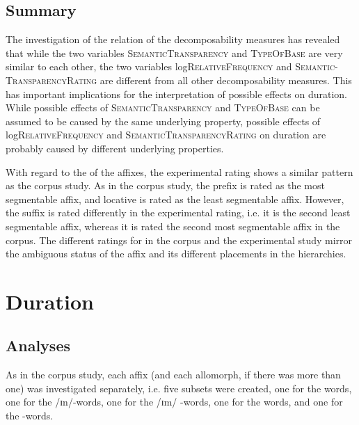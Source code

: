 \subsection{Summary}

The investigation of the relation of the decomposability measures has revealed that while the two variables \textsc{SemanticTransparency} and \textsc{TypeOfBase} are very similar to each other, the two variables log\textsc{RelativeFrequency} and \textsc{Semantic-TransparencyRating} are different from all other decomposability measures.
This has important implications for the interpretation of possible  effects on duration. While possible effects of \textsc{SemanticTransparency} and \textsc{TypeOfBase} can be assumed to be caused by the same underlying property, possible effects of log\textsc{RelativeFrequency} and \textsc{SemanticTransparencyRating} on duration are probably caused by different underlying properties.



With regard to the  of the affixes, the experimental rating shows a similar pattern as the corpus study. As in the corpus study, the prefix  is rated as the most segmentable affix, and locative  is rated as the least segmentable affix. However, the suffix  is rated differently in the experimental rating, i.e. it is the second least segmentable affix, whereas it is rated the second most segmentable affix in the corpus. The different ratings for  in the corpus and the experimental study mirror the ambiguous  status of the affix and its different placements in the  hierarchies. 



\section{Duration}


\subsection{Analyses} \label{analsyses duration experiment}

As in the corpus study, each affix (and each allomorph, if there was more than one) was investigated separately, i.e. five subsets were created, one for the  words, one for the /ɪn/-words, one for the /ɪm/ -words, one for the words, and one for the -words.

